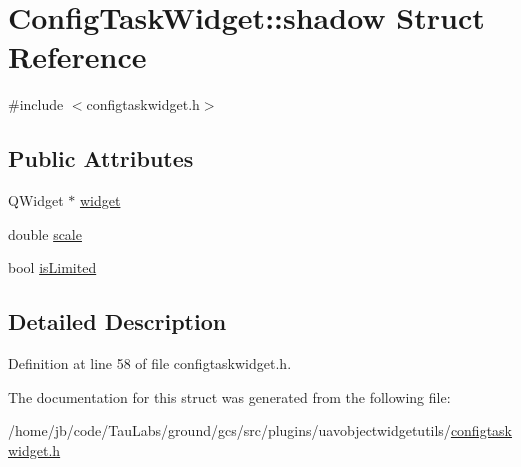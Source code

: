\hypertarget{struct_config_task_widget_1_1shadow}{\section{\-Config\-Task\-Widget\-:\-:shadow \-Struct \-Reference}
\label{struct_config_task_widget_1_1shadow}
}


{\ttfamily \#include $<$configtaskwidget.\-h$>$}

\subsection*{\-Public \-Attributes}
\begin{DoxyCompactItemize}
\item 
\-Q\-Widget $\ast$ \hyperlink{group___u_a_v_object_widget_utils_ga06fc48ad3875446139f13fbb5b85cdcf}{widget}
\item 
double \hyperlink{group___u_a_v_object_widget_utils_ga06ad87fdaa5af70d7239dda785c76f76}{scale}
\item 
bool \hyperlink{group___u_a_v_object_widget_utils_ga712acd84a5850623406835776b1840b4}{is\-Limited}
\end{DoxyCompactItemize}


\subsection{\-Detailed \-Description}


\-Definition at line 58 of file configtaskwidget.\-h.



\-The documentation for this struct was generated from the following file\-:\begin{DoxyCompactItemize}
\item 
/home/jb/code/\-Tau\-Labs/ground/gcs/src/plugins/uavobjectwidgetutils/\hyperlink{configtaskwidget_8h}{configtaskwidget.\-h}\end{DoxyCompactItemize}
